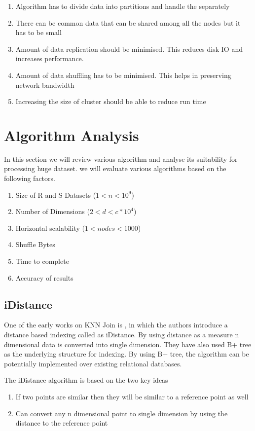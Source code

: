 \documentclass[conference]{IEEEtran}
\begin{document}
\begin{enumerate}
\item Algorithm has to divide data into partitions and handle the separately
\item There can be common data that can be shared among all the nodes
  but it has to be small
\item Amount of data replication should be minimised. This reduces
  disk IO and increases performance.
\item Amount of data shuffling has to be minimised. This helps in
  preserving network bandwidth
\item Increasing the size of cluster should be able to reduce run time
\end{enumerate}


\section{Algorithm Analysis}
In this section we will review various algorithm and analyse its
suitability for processing huge dataset. we will evaluate various
algorithms based on the following factors.
\begin{enumerate}
\item Size of R and S Datasets ($1 < n < 10^9$)
\item Number of Dimensions ($2 < d < c*10^4$)
\item Horizontal scalability ($1 < nodes < 1000$)
\item Shuffle Bytes
\item Time to complete
\item Accuracy of results
\end{enumerate}

\bigskip
\subsection{iDistance}
One of the early works on KNN Join is \cite{jagadish_idistance:_2005}, in which the authors
introduce a distance based indexing called as iDistance. By using
distance as a measure n dimensional data is converted into single
dimension. They have also used B+ tree as the underlying structure for indexing. By using B+ tree, the
algorithm can be potentially implemented over existing relational databases.

\bigskip
The iDistance algorithm is based on the two key ideas
\begin{enumerate}
\item If two points are similar then they will be similar to a
  reference point as well
\item Can convert any n dimensional point to single dimension by using
  the distance to the reference point
\end{enumerate}
\end{document}
